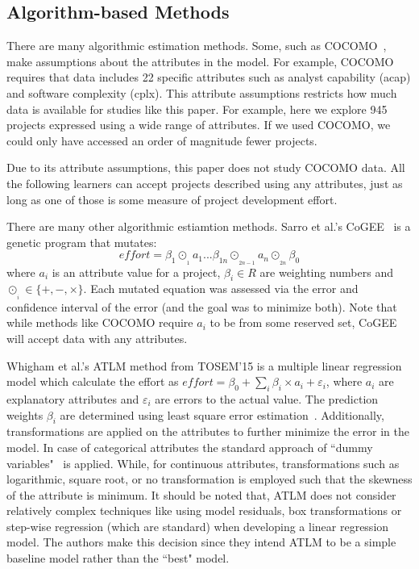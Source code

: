 
\subsection{Algorithm-based Methods}
\label{sec:3}

There are many  algorithmic estimation methods. Some, such as COCOMO~\cite{boehm1981software}, make assumptions
about the  attributes in the model. For example, COCOMO requires that 
data includes 22 specific   attributes such as analyst capability (acap) and software complexity (cplx).  This   attribute
assumptions restricts how much data is available for studies like this paper. 
For example,
here we explore 945 projects expressed using a  wide range of  attributes.  If we used COCOMO, we could only have accessed an order of magnitude   fewer projects. 

Due to its attribute assumptions, this paper does not study COCOMO data. 
All the following learners can accept projects described using any attributes, just as long as one of those is some measure of project development effort.

There are many other algorithmic estiamtion methods.
Sarro et al.'s CoGEE~\cite{sarro2016multi} is a genetic program
that mutates: 
\[\mathit{effort} = \beta_1 \odot_{_{1}} a_1  ... \beta_{1n} \odot_{_{2n-1}} a_n  \odot_{_{2n}} \beta_0\]
where $a_i$ is an attribute value for a project,  $\beta_i \in R$ are weighting numbers and
\mbox{$\odot_{_{i}}\in \{+,-,\times\}$}. Each mutated equation was assessed via the error and confidence interval of the error (and the goal was to minimize both). Note that while methods like COCOMO require $a_i$ to be from some reserved set, 
CoGEE will accept data with any attributes.



Whigham et al.'s ATLM method from TOSEM'15 is a multiple linear regression model which calculate the effort as $\mathit{effort} = \beta_0 + \sum_i\beta_i\times a_{i} +  \varepsilon_i$,  where $a_i$ are explanatory attributes and $\varepsilon_i$ are errors to the actual value. The prediction weights $\beta_i$ are determined using least square error estimation~\cite{neter1996applied}. Additionally, transformations are applied on the attributes to further minimize the error in the model. In case of categorical attributes the standard approach of ``dummy variables"~\cite{hardy1993regression} is applied. While, for continuous attributes, transformations such as logarithmic, square root,  or no transformation is employed such that the skewness of the attribute is minimum. It should be noted that, ATLM does not consider relatively complex techniques like using model residuals,  box transformations or step-wise regression (which are standard) when developing a linear regression model. The authors make this decision since they intend ATLM to be a simple baseline model rather than the ``best" model.

